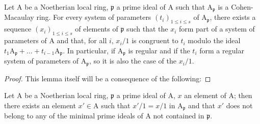 \begin{lemma}[18.11.3]
\label{IV.18.11.3}
Let $\mathrm{A}$ be a Noetherian local ring, $\mathfrak{p}$ a prime ideal of $\mathrm{A}$ such that $\mathrm{A}_\mathfrak{p}$ is a Cohen-Macaulay ring.
For every system of parameters $(t_i)_{1\leq i\leq s}$ of $\mathrm{A}_\mathfrak{p}$, there exists a sequence $(x_i)_{1\leq i\leq s}$ of elements of $\mathfrak{p}$ such that the $x_i$ form part of a system of parameters of $\mathrm{A}$ and that, for all $i$, $x_i/1$ is congruent to $t_i$ modulo the ideal $t_1\mathrm{A}_\mathfrak{p}+\ldots+t_{i-1}\mathrm{A}_\mathfrak{p}$.
In particular, if $\mathrm{A}_\mathfrak{p}$ is regular and if the $t_i$ form a regular system of parameters of $\mathrm{A}_\mathfrak{p}$, so it is also the case of the $x_i/1$.
\end{lemma}

\begin{proof}
This lemma itself will be a consequence of the following:
\end{proof}

\begin{lemma}[18.11.3.4]
\label{IV.18.11.3.4}
Let $\mathrm{A}$ be a Noetherian local ring, $\mathfrak{p}$ a prime ideal of $\mathrm{A}$, $x$ an element of $\mathrm{A}$; then there exists an element $x'\in\mathrm{A}$ such that $x'/1=x/1$ in $\mathrm{A}_\mathfrak{p}$ and that $x'$ does not belong to any of the minimal prime ideals of $\mathrm{A}$ not contained in $\mathfrak{p}$.
\end{lemma}

